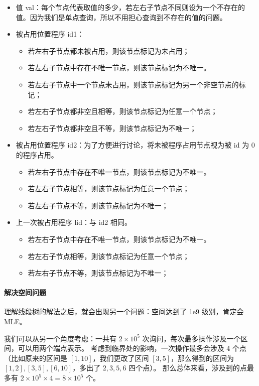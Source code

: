 \begin{itemize}
    \item 值 val：每个节点代表取值的多少，若左右子节点不同则设为一个不存在的值。因为我们是单点查询，所以不用担心查询到不存在的值的问题。
    \item 被占用位置程序 id1：
          \begin{itemize}
              \item 若左右子节点都未被占用，则该节点标记为未占用；
              \item 若左右子节点中存在不唯一节点，则该节点标记为不唯一。
              \item 若左右子节点中一个节点未占用，则该节点标记为另一个非空节点的标记；
              \item 若左右子节点都非空且相等，则该节点标记为任意一个节点；
              \item 若左右子节点都非空且不等，则该节点标记为不唯一；
          \end{itemize}
    \item 被占用位置程序 id2：为了方便进行讨论，将未被程序占用节点视为被 id 为 0 的程序占用。
          \begin{itemize}
              \item 若左右子节点中存在不唯一节点，则该节点标记为不唯一。
              \item 若左右子节点相等，则该节点标记为任意一个节点；
              \item 若左右子节点不等，则该节点标记为不唯一；
          \end{itemize}
    \item 上一次被占用程序 lid：与 id2 相同。
          \begin{itemize}
              \item 若左右子节点中存在不唯一节点，则该节点标记为不唯一。
              \item 若左右子节点相等，则该节点标记为任意一个节点；
              \item 若左右子节点不等，则该节点标记为不唯一；
          \end{itemize}
\end{itemize}

\paragraph{解决空间问题}

理解线段树的解法之后，就会出现另一个问题：空间达到了 1e9 级别，肯定会 MLE。

我们可以从另一个角度考虑：一共有 $2\times 10^5$ 次询问，每次最多操作涉及一个区间，可以用两个端点表示。
考虑到临界处的影响，一次操作最多会涉及 4 个点
（比如原来的区间是 $[1, 10]$，我们更改了区间 $[3,5]$，那么得到的区间为 $[1,2],[3,5],[6,10]$，多出了 $2,3,5,6$ 四个点）。
那么总体来看，涉及到的点最多有 $2\times 10^5\times 4 = 8\times 10^5$ 个。


